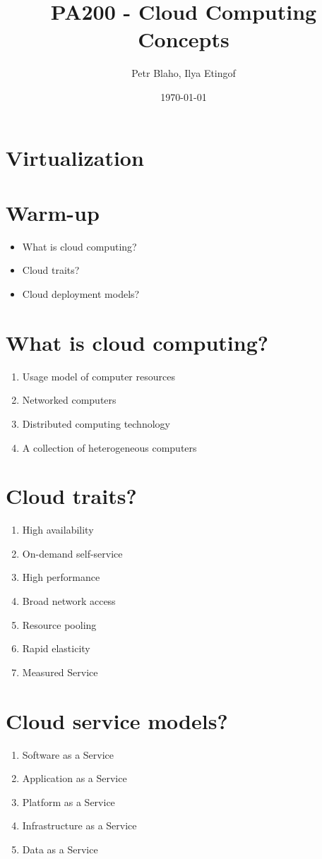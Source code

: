 \documentclass[11pt]{article}
\author{Petr Blaho, Ilya Etingof}
\date{\today}
\title{PA200 - Cloud Computing Concepts}
\begin{document}
\maketitle


\section*{Virtualization}
\label{sec:org94f2f02}

\section*{Warm-up}
\label{sec:org14080cd}
\begin{itemize}
\item What is cloud computing?
\item Cloud traits?
\item Cloud deployment models?
\end{itemize}

\section*{What is cloud computing?}
\label{sec:orge3bf509}
\begin{enumerate}
\item Usage model of computer resources
\item Networked computers
\item Distributed computing technology
\item A collection of heterogeneous computers
\end{enumerate}

\section*{Cloud traits?}
\label{sec:org78ee609}
\begin{enumerate}
\item High availability
\item On-demand self-service
\item High performance
\item Broad network access
\item Resource pooling
\item Rapid elasticity
\item Measured Service
\end{enumerate}

\section*{Cloud service models?}
\label{sec:orga335e97}
\begin{enumerate}
\item Software as a Service
\item Application as a Service
\item Platform as a Service
\item Infrastructure as a Service
\item Data as a Service
\end{enumerate}
\end{document}
